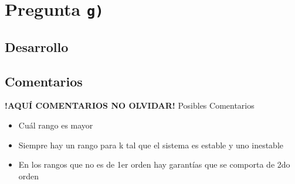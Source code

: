 \section{Pregunta \texttt{g)}}\label{pregunta-g}
\subsection{Desarrollo}



\FloatBarrier
\subsection{Comentarios}


\textbf{!AQUÍ COMENTARIOS NO OLVIDAR!}
Posibles Comentarios
\begin{itemize}
    \item Cuál rango es mayor
    \item Siempre hay un rango para k tal que el sistema es estable y uno inestable
    \item En los rangos que no es de 1er orden hay garantías que se comporta de 2do orden
\end{itemize}